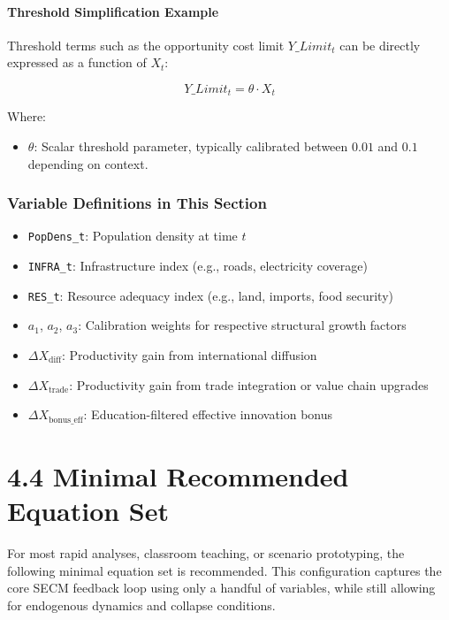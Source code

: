 \documentclass[12pt]{report}
\begin{document}
\vspace{0.5em}
\paragraph{Threshold Simplification Example}

Threshold terms such as the opportunity cost limit $Y\_Limit_t$ can be directly expressed as a function of $X_t$:

\begin{equation}
Y\_Limit_t = \theta \cdot X_t
\end{equation}

\noindent Where:
\begin{itemize}
  \item $\theta$: Scalar threshold parameter, typically calibrated between $0.01$ and $0.1$ depending on context.
\end{itemize}

\vspace{0.5em}
\subsubsection*{Variable Definitions in This Section}

\begin{itemize}
  \item \texttt{PopDens\_t}: Population density at time $t$
  \item \texttt{INFRA\_t}: Infrastructure index (e.g., roads, electricity coverage)
  \item \texttt{RES\_t}: Resource adequacy index (e.g., land, imports, food security)
  \item $a_1$, $a_2$, $a_3$: Calibration weights for respective structural growth factors
  \item $\Delta X_{\text{diff}}$: Productivity gain from international diffusion
  \item $\Delta X_{\text{trade}}$: Productivity gain from trade integration or value chain upgrades
  \item $\Delta X_{\text{bonus\_eff}}$: Education-filtered effective innovation bonus
\end{itemize}

\section{4.4 Minimal Recommended Equation Set}

For most rapid analyses, classroom teaching, or scenario prototyping, the following minimal equation set is recommended. This configuration captures the core SECM feedback loop using only a handful of variables, while still allowing for endogenous dynamics and collapse conditions.
\end{document}
